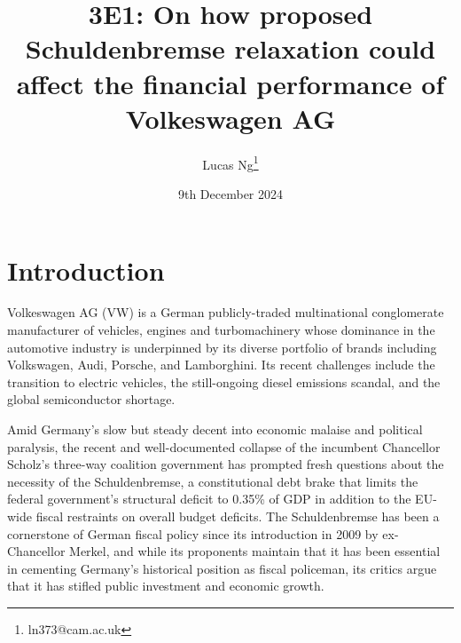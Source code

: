 \documentclass[10pt]{article}
\title{3E1: On how proposed Schuldenbremse relaxation could affect the financial performance of Volkeswagen AG}
\author{Lucas Ng\footnote{ln373@cam.ac.uk}}
\date{9th December 2024}
\begin{document}
\maketitle


\section{Introduction}
Volkeswagen AG (VW) is a German publicly-traded multinational conglomerate manufacturer of vehicles, engines and turbomachinery whose dominance in the automotive industry is underpinned by its diverse portfolio of brands including Volkswagen, Audi, Porsche, and Lamborghini. Its recent challenges include the transition to electric vehicles, the still-ongoing diesel emissions scandal, and the global semiconductor shortage.


Amid Germany's slow but steady decent into economic malaise and political paralysis, the recent and well-documented collapse of the incumbent Chancellor Scholz's three-way coalition government has prompted fresh questions about the necessity of the Schuldenbremse, a constitutional debt brake that limits the federal government's structural deficit to 0.35\% of GDP in addition to the EU-wide fiscal restraints on overall budget deficits.\@
The Schuldenbremse has been a cornerstone of German fiscal policy since its introduction in 2009 by ex-Chancellor Merkel,
and while its proponents maintain that it has been essential in cementing Germany's historical position as fiscal policeman, its critics argue that it has stifled public investment and economic growth.
\end{document}
